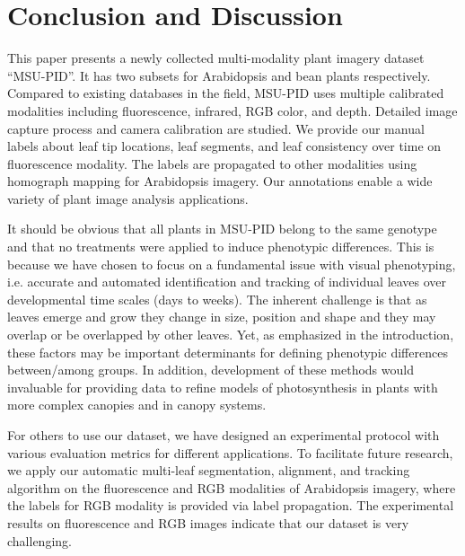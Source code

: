 \section{Conclusion and Discussion}

This paper presents a newly collected multi-modality plant imagery dataset ``MSU-PID''.
It has two subsets for Arabidopsis and bean plants respectively.
Compared to existing databases in the field, MSU-PID uses multiple calibrated modalities including fluorescence, infrared, RGB color, and depth.
Detailed image capture process and camera calibration are studied.
We provide our manual labels about leaf tip locations, leaf segments, and leaf consistency over time on fluorescence modality.
The labels are propagated to other modalities using homograph mapping for Arabidopsis imagery.
Our annotations enable a wide variety of plant image analysis applications.

It should be obvious that all plants in MSU-PID belong to the same genotype and that no treatments were applied to induce phenotypic differences.  
This is because we have chosen to focus on a fundamental issue with visual phenotyping, i.e. accurate and automated identification and tracking of individual leaves over developmental time scales (days to weeks).  
The inherent challenge is that as leaves emerge and grow they change in size, position and shape and they may overlap or be overlapped by other leaves.  
Yet, as emphasized in the introduction, these factors may be important determinants for defining phenotypic differences between/among groups.  
In addition, development of these methods would invaluable for providing data to refine models of photosynthesis in plants with more complex canopies and in canopy systems.  

For others to use our dataset, we have designed an experimental protocol with various evaluation metrics for different applications.
To facilitate future research, we apply our automatic multi-leaf segmentation, alignment, and tracking algorithm on the fluorescence and RGB modalities of Arabidopsis imagery, where the labels for RGB modality is provided via label propagation.
The experimental results on fluorescence and RGB images indicate that our dataset is very challenging.


